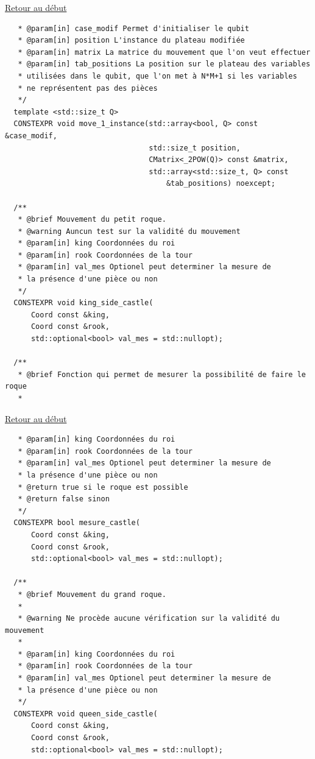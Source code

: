 {\begin{frame}[fragile]
\hyperlink{conclusion}{Retour au début}\newline
\begin{verbatim}
   * @param[in] case_modif Permet d'initialiser le qubit
   * @param[in] position L'instance du plateau modifiée
   * @param[in] matrix La matrice du mouvement que l'on veut effectuer
   * @param[in] tab_positions La position sur le plateau des variables
   * utilisées dans le qubit, que l'on met à N*M+1 si les variables
   * ne représentent pas des pièces
   */
  template <std::size_t Q>
  CONSTEXPR void move_1_instance(std::array<bool, Q> const &case_modif,
                                 std::size_t position,
                                 CMatrix<_2POW(Q)> const &matrix,
                                 std::array<std::size_t, Q> const
                                     &tab_positions) noexcept;

  /**
   * @brief Mouvement du petit roque.
   * @warning Auncun test sur la validité du mouvement
   * @param[in] king Coordonnées du roi
   * @param[in] rook Coordonnées de la tour
   * @param[in] val_mes Optionel peut determiner la mesure de
   * la présence d'une pièce ou non
   */
  CONSTEXPR void king_side_castle(
      Coord const &king,
      Coord const &rook,
      std::optional<bool> val_mes = std::nullopt);

  /**
   * @brief Fonction qui permet de mesurer la possibilité de faire le roque
   *
\end{verbatim}
\end{frame}

\begin{frame}[fragile]
\hyperlink{conclusion}{Retour au début}\newline
\begin{verbatim}
   * @param[in] king Coordonnées du roi
   * @param[in] rook Coordonnées de la tour
   * @param[in] val_mes Optionel peut determiner la mesure de
   * la présence d'une pièce ou non
   * @return true si le roque est possible
   * @return false sinon
   */
  CONSTEXPR bool mesure_castle(
      Coord const &king,
      Coord const &rook,
      std::optional<bool> val_mes = std::nullopt);

  /**
   * @brief Mouvement du grand roque.
   *
   * @warning Ne procède aucune vérification sur la validité du mouvement
   *
   * @param[in] king Coordonnées du roi
   * @param[in] rook Coordonnées de la tour
   * @param[in] val_mes Optionel peut determiner la mesure de
   * la présence d'une pièce ou non
   */
  CONSTEXPR void queen_side_castle(
      Coord const &king,
      Coord const &rook,
      std::optional<bool> val_mes = std::nullopt);


\end{verbatim}
\end{frame}}
